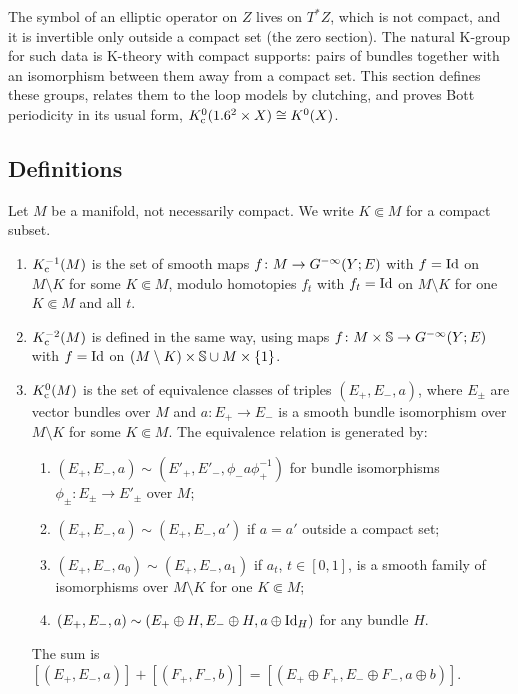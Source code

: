 The symbol of an elliptic operator on $Z$ lives on $T^*Z$, which is not compact,
and it is invertible only outside a compact set (the zero section). The natural
K-group for such data is K-theory with compact supports: pairs of bundles
together with an isomorphism between them away from a compact set. This section
defines these groups, relates them to the loop models by clutching, and proves
Bott periodicity in its usual form, $K_{\mathrm{c}}^0(1.6^2\times X)\cong K^0(X)$.

\subsection{Definitions}
Let $M$ be a manifold, not necessarily compact. We write $K\Subset M$ for a compact subset.

\begin{definition}\label{bott:def:Kc}
  \begin{enumerate}[label=(\roman*)]
  \item $K_{\mathrm{c}}^{-1}(M)$ is the set of smooth maps $f\colon M\to G^{-\infty}(Y;E)$ with $f=\operatorname{Id}$ on
    $M\setminus K$ for some $K\Subset M$, modulo homotopies $f_t$ with $f_t=\operatorname{Id}$ on
    $M\setminus K$ for one $K\Subset M$ and all $t$.
  \item $K_{\mathrm{c}}^{-2}(M)$ is defined in the same way, using maps $f\colon M\times\mathbb{S}\to G^{-\infty}(Y;E)$
    with $f=\operatorname{Id}$ on $(M\setminus K)\times\mathbb{S}\cup M\times\{1\}$.
  \item $K_{\mathrm{c}}^0(M)$ is the set of equivalence classes of triples $(E_+,E_-,a)$, where $E_\pm$
    are vector bundles over $M$ and $a\colon E_+\to E_-$ is a smooth bundle isomorphism over
    $M\setminus K$ for some $K\Subset M$. The equivalence relation is generated by:
    \begin{enumerate}[label=(\alph*)]
    \item $(E_+,E_-,a)\sim(E'_+,E'_-,\phi_-a\phi_+^{-1})$ for bundle isomorphisms
      $\phi_\pm\colon E_\pm\to E'_\pm$ over $M$;
    \item $(E_+,E_-,a)\sim(E_+,E_-,a')$ if $a=a'$ outside a compact set;
    \item $(E_+,E_-,a_0)\sim(E_+,E_-,a_1)$ if $a_t$, $t\in[0,1]$, is a smooth family of
      isomorphisms over $M\setminus K$ for one $K\Subset M$;
    \item $(E_+,E_-,a)\sim(E_+\oplus H,E_-\oplus H,a\oplus\operatorname{Id}_H)$ for any bundle $H$.
    \end{enumerate}
    The sum is $[(E_+,E_-,a)]+[(F_+,F_-,b)]=[(E_+\oplus F_+,E_-\oplus F_-,a\oplus b)]$.
  \end{enumerate}
\end{definition}


